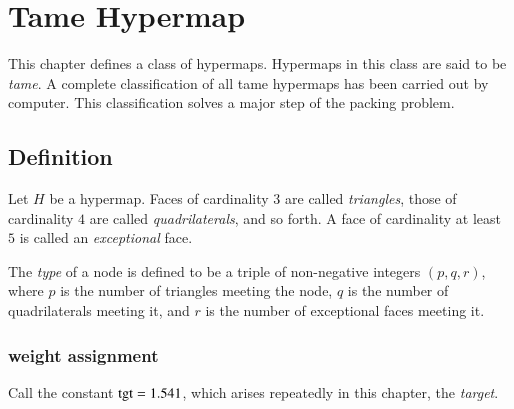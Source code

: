 

\chapter{Tame Hypermap}

\label{sec:tame}


This chapter defines a class of hypermaps.  Hypermaps in this class
are said to be {\it tame}.  A complete
classification of all tame hypermaps has been carried out by computer.   This classification solves a
major step of the packing problem.



\section{Definition}


\begin{definition}
Let $H$ be a hypermap.
Faces of cardinality $3$ are called {\it triangles}, those of
cardinality $4$ are called {\it quadrilaterals}, and so forth.  A face of
cardinality at least $5$ is called an {\it exceptional\/} face.
\end{definition}

\begin{definition}[type,~$(p,q,r)$]\label{definition:type}
The {\it type\/} of a node is defined to be a triple of
non-negative integers $(p,q,r)$, where $p$ is the number of
triangles meeting the node, $q$ is the number of quadrilaterals
meeting it, and $r$ is the number of exceptional faces meeting it.
%
\end{definition}


\subsection{weight assignment}\label{sec:wtassign}

Call the constant ${\operatorname{tgt}}=1.541$, which arises repeatedly in
this chapter, the {\it target}. 
%


